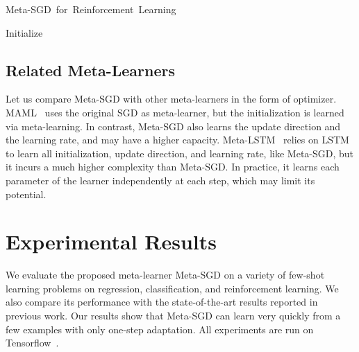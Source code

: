 \documentclass{article}
\begin{document}
\IncMargin{1.5em}
\begin{algorithm}[h]
	\caption{\small \mbox{Meta-SGD for Reinforcement Learning}}
	\label{algo:train_reinforcement}
	\SetAlgoNoLine
	
	\Indm
	\KwOut{
	}

	\Indp
	Initialize \;
	
\end{algorithm}

\subsection{Related Meta-Learners}

Let us compare Meta-SGD with other meta-learners in the form of optimizer. MAML~\cite{finn2017model} uses the original SGD as meta-learner, but the initialization is learned via meta-learning. In contrast, Meta-SGD also learns the update direction and the learning rate, and may have a higher capacity. Meta-LSTM~\cite{ravi2017optimization} relies on LSTM to learn all initialization, update direction, and learning rate, like Meta-SGD, but it incurs a much higher complexity than Meta-SGD. In practice, it learns each parameter of the learner independently at each step, which may limit its potential.













 \section{Experimental Results}
\label{sec:experiment}

We evaluate the proposed meta-learner Meta-SGD on a variety of few-shot learning problems on regression, classification, and reinforcement learning. We also compare its performance with the state-of-the-art results reported in previous work. Our results show that Meta-SGD can learn very quickly from a few examples with only one-step adaptation.
All experiments are run on Tensorflow~\cite{abadi2016tensorflow}.
\end{document}
